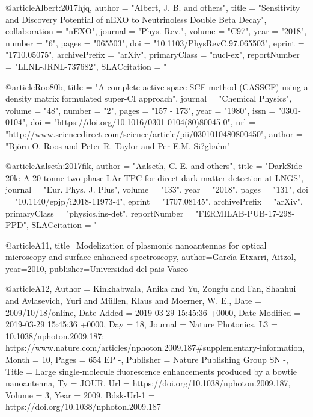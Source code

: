@article{Albert:2017hjq,
      author         = "Albert, J. B. and others",
      title          = "{Sensitivity and Discovery Potential of nEXO to
                        Neutrinoless Double Beta Decay}",
      collaboration  = "nEXO",
      journal        = "Phys. Rev.",
      volume         = "C97",
      year           = "2018",
      number         = "6",
      pages          = "065503",
      doi            = "10.1103/PhysRevC.97.065503",
      eprint         = "1710.05075",
      archivePrefix  = "arXiv",
      primaryClass   = "nucl-ex",
      reportNumber   = "LLNL-JRNL-737682",
      SLACcitation   = "%
}

@article{Roo80b,
title = "A complete active space SCF method (CASSCF) using a density matrix formulated super-CI approach",
journal = "Chemical Physics",
volume = "48",
number = "2",
pages = "157 - 173",
year = "1980",
issn = "0301-0104",
doi = "https://doi.org/10.1016/0301-0104(80)80045-0",
url = "http://www.sciencedirect.com/science/article/pii/0301010480800450",
author = "Björn O. Roos and Peter R. Taylor and Per E.M. Si?gbahn"}

@article{Aalseth:2017fik,
      author         = "Aalseth, C. E. and others",
      title          = "{DarkSide-20k: A 20 tonne two-phase LAr TPC for direct
                        dark matter detection at LNGS}",
      journal        = "Eur. Phys. J. Plus",
      volume         = "133",
      year           = "2018",
      pages          = "131",
      doi            = "10.1140/epjp/i2018-11973-4",
      eprint         = "1707.08145",
      archivePrefix  = "arXiv",
      primaryClass   = "physics.ins-det",
      reportNumber   = "FERMILAB-PUB-17-298-PPD",
      SLACcitation   = "%
}

@article{A11,
  title={Modelization of plasmonic nanoantennas for optical microscopy and surface enhanced spectroscopy},
  author={Garc{\'\i}a-Etxarri, Aitzol},
  year={2010},
  publisher={Universidad del pais Vasco}
}


@article{A12,
	Author = {Kinkhabwala, Anika and Yu, Zongfu and Fan, Shanhui and Avlasevich, Yuri and M{\"u}llen, Klaus and Moerner, W. E.},
	Date = {2009/10/18/online},
	Date-Added = {2019-03-29 15:45:36 +0000},
	Date-Modified = {2019-03-29 15:45:36 +0000},
	Day = {18},
	Journal = {Nature Photonics},
	L3 = {10.1038/nphoton.2009.187; https://www.nature.com/articles/nphoton.2009.187#supplementary-information},
	Month = {10},
	Pages = {654 EP  -},
	Publisher = {Nature Publishing Group SN  -},
	Title = {Large single-molecule fluorescence enhancements produced by a bowtie nanoantenna},
	Ty = {JOUR},
	Url = {https://doi.org/10.1038/nphoton.2009.187},
	Volume = {3},
	Year = {2009},
	Bdsk-Url-1 = {https://doi.org/10.1038/nphoton.2009.187}
	}


